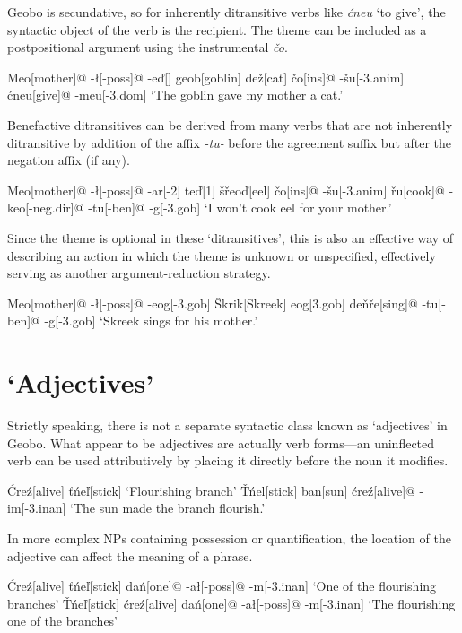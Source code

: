 \documentclass[a4paper,11pt,oneside,openany]{memoir}
\newcommand{\vt}{ť}
\newcommand{\vd}{ď}
\newcommand{\vc}{č}
\newcommand{\vz}{ž}
\newcommand{\vs}{š}
\newcommand{\vr}{ř}
\newcommand{\vl}{ľ}
\newcommand{\vn}{ň}
\newcommand{\vT}{Ť}
\newcommand{\vS}{Š}
\begin{document}
Geobo{\engma} is secundative, so for inherently ditransitive verbs like \textit{\'cneu} `to give', the syntactic object of the verb is the recipient. The theme can be included as a postpositional argument using the instrumental \textit{\vc o}.

\ex
\begingl
Meo[mother]@
-\l[\sc -poss]@
-e{\vd}[]
geob[goblin]
de{\vz}[cat]
\vc o[\sc ins]@
-\vs u[\sc -3.anim]
\'cneu[give]@
-meu[\sc -3.dom]
\glft `The goblin gave my mother a cat.'
\endgl
\xe

Benefactive ditransitives can be derived from many verbs that are not inherently ditransitive by addition of the affix \textit{-tu-} before the agreement suffix but after the negation affix (if any).

\ex
\begingl
Meo[mother]@
-\l[\sc -poss]@
-ar[-2]
te{\vd}[1]
\vs\vr eo{\vd}[eel]
\vc o[\sc ins]@
-\vs u[\sc -3.anim] 
\vr u[cook]@
-keo[-{\sc neg.dir}]@
-tu[-{\sc ben}]@
-g[-{\sc 3.gob}]
\glft `I won't cook eel for your mother.'
\endgl
\xe

Since the theme is optional in these `ditransitives', this is also an effective way of describing an action in which the theme is unknown or unspecified, effectively serving as another argument-reduction strategy.

\ex
\begingl
Meo[mother]@
-\l[\sc -poss]@
-eog[\sc -3.gob]
\vS krik[Skreek]
eog[\sc 3.gob]
de\vn\vr e[sing]@
-tu[\sc -ben]@
-g[\sc -3.gob]
\glft `Skreek sings for his mother.'
\endgl
\xe

\section{`Adjectives'}

Strictly speaking, there is not a separate syntactic class known as `adjectives' in Geobo{\engma}. What appear to be adjectives are actually verb forms---an uninflected verb can be used attributively by placing it directly before the noun it modifies.

\pex
\a
\begingl
\'Cre\'z[alive]
\vt\'ne\vl[stick]
\glft  `Flourishing branch'
\endgl
\a 
\begingl
\vT\'nel[stick]
ban[sun]
\'cre\'z[alive]@
-im[\sc -3.inan]
\glft `The sun made the branch flourish.'
\endgl
\xe

In more complex NPs containing possession or quantification, the location of the adjective can affect the meaning of a phrase.

\pex
\a
\begingl
\'Cre\'z[alive]
\vt\'ne{\vl}[stick]
da\'n[one]@
-a\l[-{\sc poss}]@
-m[-{\sc 3.inan}]
\glft  `One of the flourishing branches'
\endgl
\a
\begingl
\vT\'ne{\vl}[stick]
\'cre\'z[alive]
da\'n[one]@
-a\l[-{\sc poss}]@
-m[-{\sc 3.inan}]
\glft  `The flourishing one of the branches'
\endgl
\xe
\end{document}
